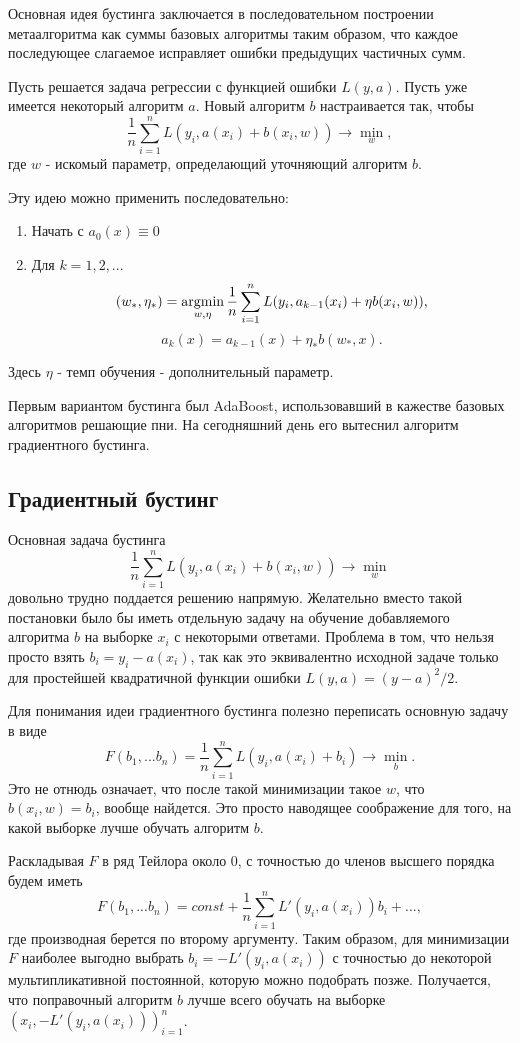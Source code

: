 Основная идея бустинга заключается в последовательном построении метаалгоритма как суммы базовых алгоритмы таким образом, что каждое последующее слагаемое исправляет ошибки предыдущих частичных сумм.

Пусть решается задача регрессии с функцией ошибки $L(y, a)$. Пусть уже имеется некоторый алгоритм $a$. Новый алгоритм $b$ настраивается так, чтобы 
$$
\frac{1}{n}\sum_{i=1}^nL(y_i, a(x_i) + b(x_i, w)) \rightarrow \min_w,
$$
где $w$ - искомый параметр, определающий уточняющий алгоритм $b$.

Эту идею можно применить последовательно:
\begin{enumerate}
    \item Начать с $a_0(x) \equiv 0$ 
    \item Для $k = 1, 2, ...$ 
$$
(w_*, \eta_*) = \operatorname*{argmin}_{w, \eta} \frac{1}{n}\sum_{i=1}^nL(y_i, a_{k-1}(x_i) + \eta b(x_i, w)),
$$
$$
a_k(x) = a_{k-1}(x) + \eta_*b(w_*, x).
$$
\end{enumerate}
Здесь $\eta$ - темп обучения - дополнительный параметр.

Первым вариантом бустинга был AdaBoost, использовавший в кажестве базовых алгоритмов решающие пни. На сегодняшний день его вытеснил алгоритм градиентного бустинга.

\subsection{Градиентный бустинг}

Основная задача бустинга
$$
\frac{1}{n}\sum_{i=1}^nL(y_i, a(x_i) + b(x_i, w)) \rightarrow \min_w
$$
довольно трудно поддается решению напрямую. Желательно вместо такой постановки было бы иметь отдельную задачу на обучение добавляемого алгоритма $b$ на выборке $x_i$ с некоторыми ответами. Проблема в том, что нельзя просто взять $b_i = y_i - a(x_i)$, так как это эквивалентно исходной задаче только для простейшей квадратичной функции ошибки $L(y, a) = (y - a)^2/2$.

Для понимания идеи градиентного бустинга полезно переписать основную задачу в виде
$$
F(b_1, ... b_n) = \frac{1}{n}\sum_{i=1}^nL(y_i, a(x_i) + b_i) \rightarrow \min_b.
$$
Это не отнюдь означает, что после такой минимизации такое $w$, что $b(x_i, w) = b_i$, вообще найдется. Это просто наводящее соображение для того, на какой выборке лучше обучать алгоритм $b$.

Раскладывая $F$ в ряд Тейлора около 0, с точностью до членов высшего порядка будем иметь
$$
F(b_1, ... b_n) = const + \frac{1}{n}\sum_{i=1}^nL'(y_i, a(x_i))b_i + ...,
$$
где производная берется по второму аргументу.
Таким образом, для минимизации $F$ наиболее выгодно выбрать $b_i = -L'(y_i, a(x_i))$ с точностью до некоторой мультипликативной постоянной, которую можно подобрать позже. Получается, что поправочный алгоритм $b$ лучше всего обучать на выборке $(x_i, -L'(y_i, a(x_i)))_{i=1}^n$. 

